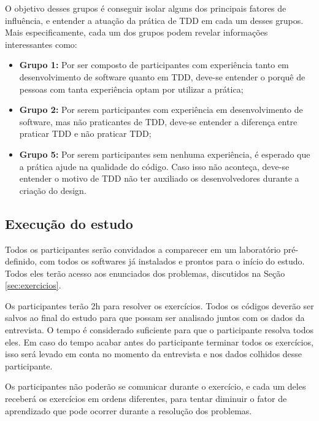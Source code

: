 O objetivo desses grupos é conseguir isolar alguns dos principais fatores de influência,
e entender a atuação da prática de TDD em cada um desses grupos. Mais especificamente,
cada um dos grupos podem revelar informações interessantes como:

\begin{itemize}
	\item \textbf{Grupo 1:} Por ser composto de participantes com experiência tanto
	em desenvolvimento de software quanto em TDD, deve-se entender o porquê de
	pessoas com tanta experiência optam por utilizar a prática;
	
	\item \textbf{Grupo 2:} Por serem participantes com experiência em desenvolvimento
	de software, mas não praticantes de TDD, deve-se entender a diferença entre
	praticar TDD e não praticar TDD;
		
	\item \textbf{Grupo 5:} Por serem participantes sem nenhuma experiência, é esperado que
	a prática ajude na qualidade do código. Caso isso não aconteça, deve-se entender o motivo de TDD
	não ter auxiliado os desenvolvedores durante a criação do design.
\end{itemize}

\subsection{Execução do estudo}
\label{sec:execucao}	

Todos os participantes serão convidados a comparecer em um laboratório pré-definido,
com todos os softwares já instalados e prontos para o início do estudo. Todos eles
terão acesso aos enunciados dos problemas, discutidos na
Seção \ref{sec:exercicios}.

Os participantes terão 2h para resolver os exercícios. 
Todos os códigos deverão ser salvos ao final do estudo para que possam ser analisado juntos
com os dados da entrevista.
O tempo é considerado suficiente
para que o participante resolva todos eles. Em caso do tempo acabar antes do participante
terminar todos os exercícios, isso será levado em conta no momento da entrevista e nos
dados colhidos desse participante.

Os participantes não poderão se comunicar durante o exercício, e cada um deles receberá
os exercícios em ordens diferentes, para tentar diminuir o fator de aprendizado que 
pode ocorrer durante a resolução dos problemas.

